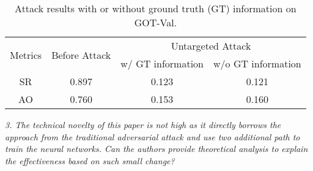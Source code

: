 \documentclass[12pt]{article}
\begin{document}
\begin{table}
    \renewcommand\thetable{IX}
    \centering
    \caption{Attack results with or without ground truth (GT) information on GOT-Val.}
    \begin{tabular}{cccc}
        \toprule
        \multirow{2}{*}{Metrics} & \multirow{2}{*}{Before Attack} & \multicolumn{2}{c}{Untargeted Attack}                                            \\
                                 &                                & w/ GT information & w/o GT information \\ \midrule
        SR                       & 0.897                          & 0.123                                & 0.121                                     \\
        AO                       & 0.760                          & 0.153                                & 0.160                                     \\                              
        \bottomrule
    \end{tabular}
    \label{tab:agent}
\end{table}

\textit{3. The technical novelty of this paper is not high as it directly borrows the approach from the traditional adversarial attack and use two additional path to train the neural networks. Can the authors provide theoretical analysis to explain the effectiveness based on such small change?}
\end{document}
